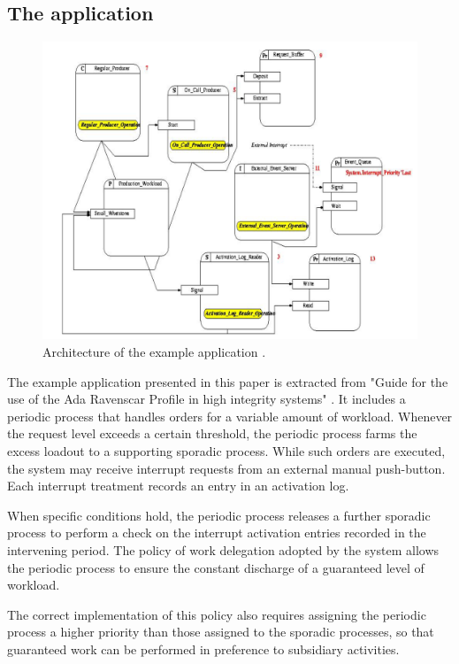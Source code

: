 \documentclass{article}
\begin{document}
\subsection{The application}\label{the-application}

\begin{figure}[!htbp]
\centering
\includegraphics[width=5in]{images/ycs}
\caption{Architecture of the example application \cite{ycs}.}
\label{ycs}
\end{figure}

The example application presented in this paper is extracted from "Guide for the use of the
Ada Ravenscar Profile in
high integrity systems" \cite{ycs}. It includes a periodic process that handles orders for a variable amount of workload. Whenever the request level exceeds a certain threshold, the periodic process farms the excess loadout to a supporting sporadic process. While such orders are executed, the system may receive interrupt requests from an external manual push-button. Each interrupt treatment records an entry in an activation log.

When specific conditions hold, the periodic process releases a further sporadic process to perform a check on the interrupt activation entries recorded in the intervening period. The policy of work delegation adopted by the system allows the periodic process to ensure the constant discharge of a guaranteed level of workload.

The correct implementation of this policy also requires assigning the periodic process a higher priority than those assigned to the sporadic processes, so that guaranteed work can be performed in preference to subsidiary activities.
\end{document}
